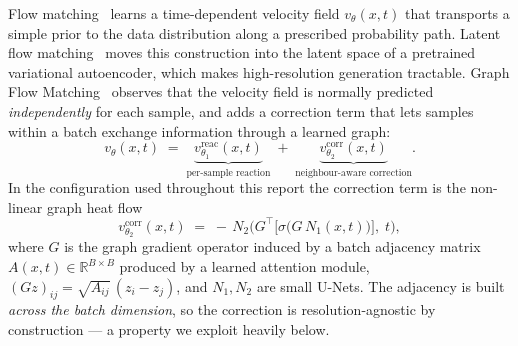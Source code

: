 \documentclass[11pt]{article}
\begin{document}
Flow matching~\citep{lipman2023flow,liu2023rectified} learns a time-dependent
velocity field $v_\theta(x,t)$ that transports a simple prior to the data
distribution along a prescribed probability path. Latent flow
matching~\citep{dao2023lfm} moves this construction into the latent space of a
pretrained variational autoencoder, which makes high-resolution generation
tractable. Graph Flow Matching~\citep{siddiqui2025gfm} observes that the
velocity field is normally predicted \emph{independently} for each sample, and
adds a correction term that lets samples within a batch exchange information
through a learned graph:
\begin{equation}
  \label{eq:gfm}
  v_\theta(x,t) \;=\; \underbrace{v^{\text{reac}}_{\theta_1}(x,t)}_{\text{per-sample reaction}}
  \;+\; \underbrace{v^{\text{corr}}_{\theta_2}(x,t)}_{\text{neighbour-aware correction}} .
\end{equation}
In the configuration used throughout this report the correction term is the
non-linear graph heat flow
\begin{equation}
  \label{eq:heat}
  v^{\text{corr}}_{\theta_2}(x,t)
  \;=\; -\,N_2\!\Big( G^{\!\top}\big[\sigma\big(G\,N_1(x,t)\big)\big],\; t \Big),
\end{equation}
where $G$ is the graph gradient operator induced by a batch adjacency matrix
$A(x,t) \in \mathbb{R}^{B\times B}$ produced by a learned attention module,
$(G z)_{ij} = \sqrt{A_{ij}}\,(z_i - z_j)$, and $N_1, N_2$ are small U-Nets. The
adjacency is built \emph{across the batch dimension}, so the correction is
resolution-agnostic by construction --- a property we exploit heavily below.
\end{document}
